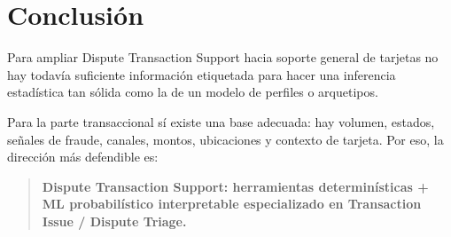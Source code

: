 \documentclass[11pt,a4paper]{article}
\begin{document}
\section{Conclusión}

Para ampliar Dispute Transaction Support hacia soporte general de tarjetas no hay todavía suficiente información etiquetada para hacer una inferencia estadística tan sólida como la de un modelo de perfiles o arquetipos.

Para la parte transaccional sí existe una base adecuada: hay volumen, estados, señales de fraude, canales, montos, ubicaciones y contexto de tarjeta. Por eso, la dirección más defendible es:

\begin{quote}
\textbf{Dispute Transaction Support: herramientas determinísticas + ML probabilístico interpretable especializado en Transaction Issue / Dispute Triage.}
\end{quote}
\end{document}
